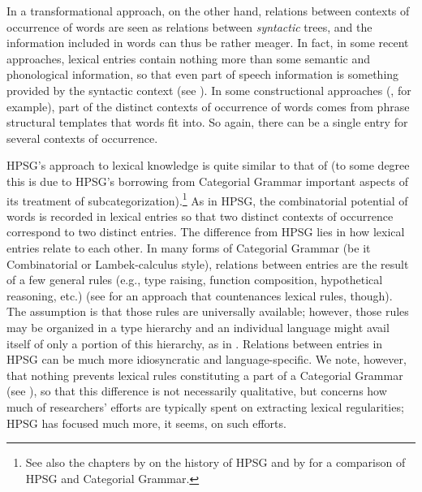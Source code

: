 \documentclass[output=paper
 	        ,biblatex
                ,babelshorthands
                ,newtxmath
                ,draftmode
                ,colorlinks, citecolor=brown
]{langscibook}
\begin{document}
In a transformational approach, on the other hand, relations between contexts of occurrence of words are seen as relations between \emph{syntactic} trees, and the information included in words can thus be rather meager. In fact, in some recent approaches, lexical entries contain nothing more than some semantic and phonological information, so that even part of speech information is something provided by the syntactic context (see \citealt{Borer2003,Marantz1997}). In some constructional approaches (\citealt{Goldberg1995}, for example), part of the distinct contexts of occurrence of words comes from phrase structural templates that words fit into. So again, there can be a single entry for several contexts of occurrence.

HPSG's approach to lexical knowledge is quite similar to that of  (to some degree this is due to HPSG's borrowing from Categorial Grammar important aspects of its treatment of subcategorization).\footnote{
See also the chapters by  on the history of HPSG and by  for a comparison of HPSG and Categorial Grammar.} As in HPSG, the combinatorial potential of words is recorded in lexical entries so that two distinct contexts of occurrence correspond to two distinct entries. The difference from HPSG lies in how lexical entries relate to each other. In many forms of Categorial Grammar (be it Combinatorial or Lambek-calculus style), relations between entries are the result of a few general rules (e.g., type raising, function composition, hypothetical reasoning, etc.) (see \citealt{Dowty1978} for an approach that countenances lexical rules, though).
The assumption is that those rules are universally available; however, those rules may be organized in a type hierarchy and an individual language might avail itself of only a portion of this hierarchy, as in \citet{Baldridge2002}. Relations between entries in HPSG can be much more idiosyncratic and language-specific. We note, however, that nothing prevents lexical rules constituting a part of a Categorial Grammar (see \citealt{Carpenter1992b}),
so that this difference is not necessarily qualitative, but concerns how much of researchers' efforts are typically spent on extracting lexical regularities; HPSG has focused much more, it seems, on such efforts.
\end{document}
